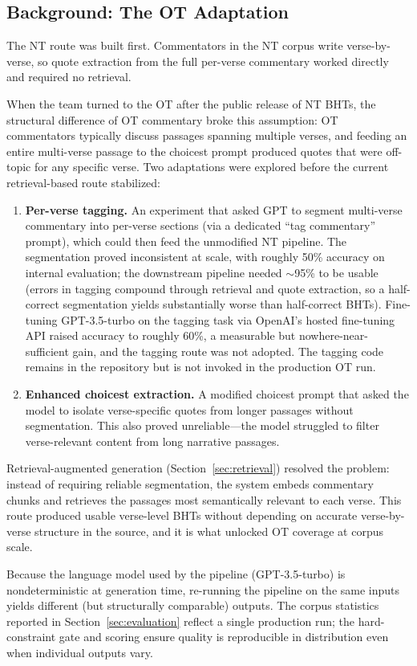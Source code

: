 \subsection{Background: The OT Adaptation}
\label{sec:otbackground}

The NT route was built first. Commentators in the NT corpus write verse-by-verse, so quote extraction from the full per-verse commentary worked directly and required no retrieval.

When the team turned to the OT after the public release of NT BHTs, the structural difference of OT commentary broke this assumption: OT commentators typically discuss passages spanning multiple verses, and feeding an entire multi-verse passage to the choicest prompt produced quotes that were off-topic for any specific verse. Two adaptations were explored before the current retrieval-based route stabilized:

\begin{enumerate}[nosep,leftmargin=*]
    \item \textbf{Per-verse tagging.} An experiment that asked GPT to segment multi-verse commentary into per-verse sections (via a dedicated ``tag commentary'' prompt), which could then feed the unmodified NT pipeline. The segmentation proved inconsistent at scale, with roughly 50\% accuracy on internal evaluation; the downstream pipeline needed $\sim$95\% to be usable (errors in tagging compound through retrieval and quote extraction, so a half-correct segmentation yields substantially worse than half-correct BHTs). Fine-tuning GPT-3.5-turbo on the tagging task via OpenAI's hosted fine-tuning API raised accuracy to roughly 60\%, a measurable but nowhere-near-sufficient gain, and the tagging route was not adopted. The tagging code remains in the repository but is not invoked in the production OT run.
    \item \textbf{Enhanced choicest extraction.} A modified choicest prompt that asked the model to isolate verse-specific quotes from longer passages without segmentation. This also proved unreliable---the model struggled to filter verse-relevant content from long narrative passages.
\end{enumerate}

\noindent Retrieval-augmented generation (Section~\ref{sec:retrieval}) resolved the problem: instead of requiring reliable segmentation, the system embeds commentary chunks and retrieves the passages most semantically relevant to each verse. This route produced usable verse-level BHTs without depending on accurate verse-by-verse structure in the source, and it is what unlocked OT coverage at corpus scale.

Because the language model used by the pipeline (GPT-3.5-turbo) is nondeterministic at generation time, re-running the pipeline on the same inputs yields different (but structurally comparable) outputs. The corpus statistics reported in Section~\ref{sec:evaluation} reflect a single production run; the hard-constraint gate and scoring ensure quality is reproducible in distribution even when individual outputs vary.
